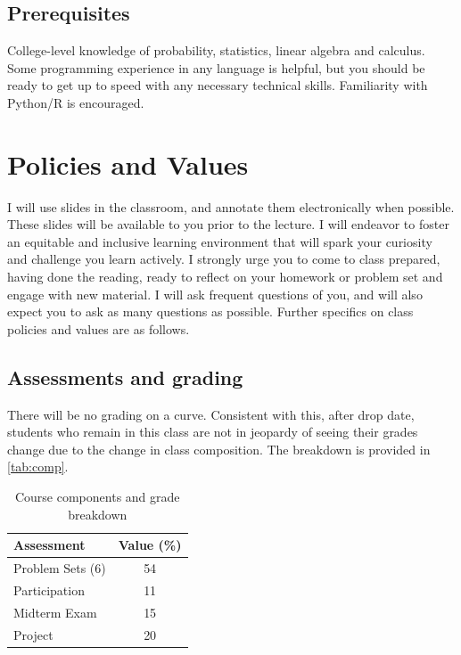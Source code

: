 \documentclass[11pt,twoside]{article}
\numberwithin{equation}{section}
\newcommand{\?}{\stackrel{?}{=}}
\begin{document}
\subsection{Prerequisites}
College-level knowledge of probability, statistics, linear algebra and calculus.
Some programming experience in any language is helpful, but you should be ready to get up to speed with any necessary technical skills.
Familiarity with Python/R is encouraged.

\section{Policies and Values}
I will use slides in the classroom, and annotate them electronically when possible.  These slides will be available to
you prior to the lecture.  I will endeavor to foster an equitable and inclusive learning environment that will spark
your curiosity and challenge you learn actively.  I strongly urge you to come to class prepared, having done the
reading, ready to reflect on your homework or problem set and engage with new material.  I will ask frequent questions
of you, and will also expect you to ask as many questions as possible.  Further specifics on class policies and values
are as follows.

\subsection{Assessments and grading}
There will be no grading on a curve.
Consistent with this, after drop date, students who remain in this class are not in jeopardy of seeing their grades change due to the change in class composition.
The breakdown is provided in \autoref{tab:comp}.

\begin{table}[h!]
  \centering
    \caption{Course components and grade breakdown}
  \label{tab:comp}
  \begin{tabular}{l   c}\toprule
    \bf Assessment   & \bf Value (\%) \\ \midrule
    Problem Sets (6)   &   54\\
    Participation      &   11 \\
    Midterm Exam      & 15 \\
    Project     &   20 \\ \bottomrule
  \end{tabular}
\end{table}


\eject
\end{document}
